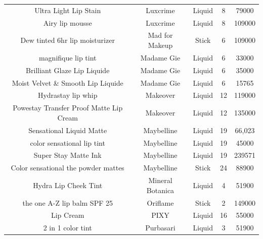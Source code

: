 \documentclass{article}
\begin{document}
\begin{longtable}{ccccc}
    Ultra Light Lip Stain                   & Luxcrime          & Liquid                       & 8               & 79000          \\
    Airy lip mousse                         & Luxcrime          & Liquid                       & 8               & 109000         \\
    Dew tinted 6hr lip moisturizer          & Mad for Makeup    & Stick                        & 6               & 109000         \\
    magnifique lip tint                     & Madame Gie        & Liquid                       & 6               & 33000          \\
    Brilliant Glaze Lip Liquide             & Madame Gie        & Liquid                       & 6               & 35000          \\
    Moist Velvet \& Smooth Lip Liquide      & Madame Gie        & Liquid                       & 6               & 15765          \\
    Hydrastay lip whip                      & Makeover          & Liquid                       & 12              & 119000         \\
    Powestay Transfer Proof Matte Lip Cream & Makeover          & Liquid                       & 12              & 135000         \\
    Sensational Liquid Matte                & Maybelline        & Liquid                       & 19              & 66,023         \\
    color sensational lip tint              & Maybelline        & Liquid                       & 19              & 45000          \\
    Super Stay Matte Ink                    & Maybelline        & Liquid                       & 19              & 239571         \\
    Color sensational the powder mattes     & Maybelline        & Stick                        & 24              & 88900          \\
    Hydra Lip Cheek Tint                    & Mineral Botanica  & Liquid                       & 4               & 51900          \\
    the one A-Z lip balm SPF 25             & Oriflame          & Stick                        & 2               & 149000         \\
    Lip Cream                               & PIXY              & Liquid                       & 16              & 55000          \\
    2 in 1 color tint                       & Purbasari         & Liquid                       & 3               & 51900          \\

\end{longtable}
\end{document}

